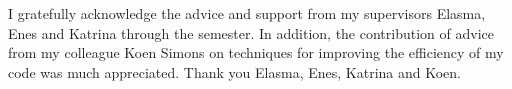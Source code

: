 

\begin{dedication}
I gratefully acknowledge the advice and support from my supervisors Elasma, Enes and Katrina through the semester.  In addition, the contribution of advice from my colleague Koen Simons on techniques for improving the efficiency of my code was much appreciated.  Thank you Elasma, Enes, Katrina and Koen.
\end{dedication}

	

